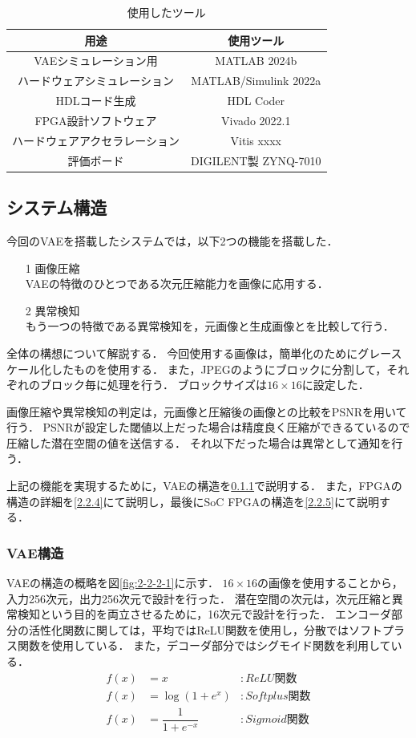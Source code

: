 \documentclass[paper]{ieicej}
\begin{document}
\begin{table}[tb]
  \centering
  \caption{使用したツール}
  \small
  \begin{tabular}{|c|c|} \hline
    用途 & 使用ツール \\ \hline \hline
    VAEシミュレーション用 & MATLAB 2024b \\ \hline
    ハードウェアシミュレーション & MATLAB/Simulink 2022a\\ \hline
    HDLコード生成 & HDL Coder \\ \hline
    FPGA設計ソフトウェア & Vivado 2022.1\\ \hline
    ハードウェアアクセラレーション & Vitis xxxx \\ \hline
    評価ボード & DIGILENT製 ZYNQ-7010 \\ \hline
  \end{tabular}
  \label{tb:1}
\end{table}


\subsection{システム構造}
今回のVAEを搭載したシステムでは，以下2つの機能を搭載した．
\begin{itemize}
  \item[1] 画像圧縮\\
  VAEの特徴のひとつである次元圧縮能力を画像に応用する．
  \item[2] 異常検知\\
  もう一つの特徴である異常検知を，元画像と生成画像とを比較して行う．  
\end{itemize}

全体の構想について解説する．
今回使用する画像は，簡単化のためにグレースケール化したものを使用する．
また，JPEGのようにブロックに分割して，それぞれのブロック毎に処理を行う．
ブロックサイズは$16\times16$に設定した．

画像圧縮や異常検知の判定は，元画像と圧縮後の画像との比較をPSNRを用いて行う．
PSNRが設定した閾値以上だった場合は精度良く圧縮ができるているので圧縮した潜在空間の値を送信する．
それ以下だった場合は異常として通知を行う．

上記の機能を実現するために，VAEの構造を\ref{2.2.3}で説明する．
また，FPGAの構造の詳細を\ref{2.2.4}にて説明し，最後にSoC FPGAの構造を\ref{2.2.5}にて説明する．

\subsubsection{VAE構造}\label{2.2.3}
VAEの構造の概略を図\ref{fig:2-2-2-1}に示す．
$16×16$の画像を使用することから，入力256次元，出力256次元で設計を行った．
潜在空間の次元は，次元圧縮と異常検知という目的を両立させるために，16次元で設計を行った．
エンコーダ部分の活性化関数に関しては，平均ではReLU関数を使用し，分散ではソフトプラス関数を使用している．
また，デコーダ部分ではシグモイド関数を利用している．
\begin{align}
  f(x) &= x &: ReLU関数\\
  f(x) &= \log(1+e^x) &: Softplus関数 \label{sq:2}\\
  f(x) &= \dfrac{1}{1+e^{-x}} &: Sigmoid関数 \label{sq:3}
\end{align}
\end{document}
